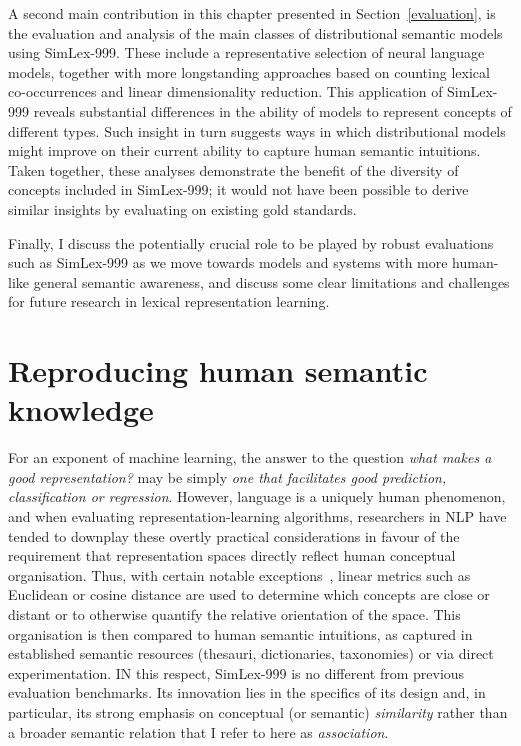 A second main contribution in this chapter presented in Section~\ref{evaluation}, is the evaluation and analysis of the main classes of distributional semantic models using SimLex-999. These include a representative selection of neural language models, together with more longstanding approaches based on counting lexical co-occurrences and linear dimensionality reduction. This application of SimLex-999 reveals substantial differences in the ability of models to represent concepts of different types. Such insight in turn suggests ways in which distributional models might improve on their current ability to capture human semantic intuitions. Taken together, these analyses demonstrate the benefit of the diversity of concepts included in SimLex-999; it would not have been possible to derive similar insights by evaluating on existing gold standards.

Finally, I discuss the potentially crucial role to be played by robust evaluations such as SimLex-999 as we move towards models and systems with more human-like general semantic awareness, and discuss some clear limitations and challenges for future research in lexical representation learning. 

\section{Reproducing human semantic knowledge}

For an exponent of machine learning, the answer to the question \emph{what makes a good representation?} may be simply \emph{one that facilitates good prediction, classification or regression}. However, language is a uniquely human phenomenon, and when evaluating  representation-learning algorithms, researchers in NLP have tended to downplay these overtly practical considerations in favour of the requirement that representation spaces directly reflect human conceptual organisation. Thus, with certain notable exceptions~\citep{collobert2008unified,turian2010word}, linear metrics such as Euclidean or cosine distance are used to determine which concepts are close or distant or to otherwise quantify the relative orientation of the space. This organisation is then compared to human semantic intuitions, as captured in established semantic resources (thesauri, dictionaries, taxonomies) or via direct experimentation. IN this respect, SimLex-999 is no different from previous evaluation benchmarks. Its innovation lies in the specifics of its design and, in particular, its strong emphasis on conceptual (or semantic) \emph{similarity} rather than a broader semantic relation that I refer to here as \emph{association}.  

